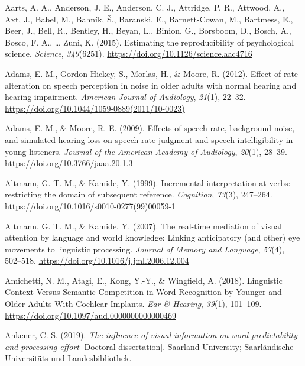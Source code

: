 \documentclass[a4paper, nobind]{templates/ociamthesis}
\newlength{\cslhangindent}
\newenvironment{CSLReferences}[2] %
 {%
  \setlength{\parindent}{0pt}
  \ifodd #1
  \let\oldpar\par
  \def\par{\hangindent=\cslhangindent\oldpar}
  \fi
  \setlength{\parskip}{1mm}
  \setlength{\baselineskip}{6mm}
 }%
 {}
\begin{document}
\hypertarget{refs}{}
\begin{CSLReferences}{1}{0}
\leavevmode{}%
Aarts, A. A., Anderson, J. E., Anderson, C. J., Attridge, P. R., Attwood, A., Axt, J., Babel, M., Bahník, Š., Baranski, E., Barnett-Cowan, M., Bartmess, E., Beer, J., Bell, R., Bentley, H., Beyan, L., Binion, G., Borsboom, D., Bosch, A., Bosco, F. A., \ldots{} Zuni, K. (2015). {Estimating the reproducibility of psychological science}. \emph{Science}, \emph{349}(6251). \url{https://doi.org/10.1126/science.aac4716}

\leavevmode{}%
Adams, E. M., Gordon-Hickey, S., Morlas, H., \& Moore, R. (2012). {Effect of rate-alteration on speech perception in noise in older adults with normal hearing and hearing impairment}. \emph{American Journal of Audiology}, \emph{21}(1), 22--32. \url{https://doi.org/10.1044/1059-0889(2011/10-0023)}

\leavevmode{}%
Adams, E. M., \& Moore, R. E. (2009). {Effects of speech rate, background noise, and simulated hearing loss on speech rate judgment and speech intelligibility in young listeners}. \emph{Journal of the American Academy of Audiology}, \emph{20}(1), 28--39. \url{https://doi.org/10.3766/jaaa.20.1.3}

\leavevmode{}%
Altmann, G. T. M., \& Kamide, Y. (1999). Incremental interpretation at verbs: restricting the domain of subsequent reference. \emph{Cognition}, \emph{73}(3), 247--264. \url{https://doi.org/10.1016/s0010-0277(99)00059-1}

\leavevmode{}%
Altmann, G. T. M., \& Kamide, Y. (2007). {The real-time mediation of visual attention by language and world knowledge: Linking anticipatory (and other) eye movements to linguistic processing}. \emph{Journal of Memory and Language}, \emph{57}(4), 502--518. \url{https://doi.org/10.1016/j.jml.2006.12.004}

\leavevmode{}%
Amichetti, N. M., Atagi, E., Kong, Y.-Y., \& Wingfield, A. (2018). Linguistic Context Versus Semantic Competition in Word Recognition by Younger and Older Adults With Cochlear Implants. \emph{Ear \& Hearing}, \emph{39}(1), 101--109. \url{https://doi.org/10.1097/aud.0000000000000469}

\leavevmode{}%
Ankener, C. S. (2019). \emph{{The influence of visual information on word predictability and processing effort}} {[}Doctoral dissertation{]}. Saarland University; Saarl{ä}ndische Universit{ä}ts-und Landesbibliothek.


\end{CSLReferences}
\end{document}
